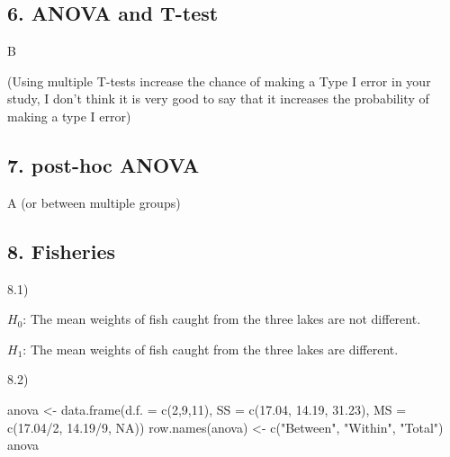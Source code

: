 \documentclass[
]{article}
\newenvironment{Shaded}{\begin{snugshade}}{\end{snugshade}}
\newcommand{\AttributeTok}[1]{\textcolor[rgb]{0.77,0.63,0.00}{#1}}
\newcommand{\ConstantTok}[1]{\textcolor[rgb]{0.00,0.00,0.00}{#1}}
\newcommand{\DecValTok}[1]{\textcolor[rgb]{0.00,0.00,0.81}{#1}}
\newcommand{\FloatTok}[1]{\textcolor[rgb]{0.00,0.00,0.81}{#1}}
\newcommand{\FunctionTok}[1]{\textcolor[rgb]{0.00,0.00,0.00}{#1}}
\newcommand{\NormalTok}[1]{#1}
\newcommand{\OtherTok}[1]{\textcolor[rgb]{0.56,0.35,0.01}{#1}}
\newcommand{\SpecialCharTok}[1]{\textcolor[rgb]{0.00,0.00,0.00}{#1}}
\newcommand{\StringTok}[1]{\textcolor[rgb]{0.31,0.60,0.02}{#1}}
\begin{document}
\hypertarget{anova-and-t-test}{%
\subsection{6. ANOVA and T-test}\label{anova-and-t-test}}

B

(Using multiple T-tests increase the chance of making a Type I error in
your study, I don't think it is very good to say that it increases the
probability of making a type I error)

\hypertarget{post-hoc-anova}{%
\subsection{\texorpdfstring{7. \textbf{post-hoc}
ANOVA}{7. post-hoc ANOVA}}\label{post-hoc-anova}}

A (or between multiple groups)

\hypertarget{fisheries}{%
\subsection{8. Fisheries}\label{fisheries}}

8.1)

\(H_0\): The mean weights of fish caught from the three lakes are not
different.

\(H_1\): The mean weights of fish caught from the three lakes are
different.

8.2)

\begin{Shaded}
\begin{Highlighting}[]
\NormalTok{anova }\OtherTok{\textless{}{-}} \FunctionTok{data.frame}\NormalTok{(}\AttributeTok{d.f. =} \FunctionTok{c}\NormalTok{(}\DecValTok{2}\NormalTok{,}\DecValTok{9}\NormalTok{,}\DecValTok{11}\NormalTok{),}
                    \AttributeTok{SS =} \FunctionTok{c}\NormalTok{(}\FloatTok{17.04}\NormalTok{, }\FloatTok{14.19}\NormalTok{, }\FloatTok{31.23}\NormalTok{),}
                    \AttributeTok{MS =} \FunctionTok{c}\NormalTok{(}\FloatTok{17.04}\SpecialCharTok{/}\DecValTok{2}\NormalTok{, }\FloatTok{14.19}\SpecialCharTok{/}\DecValTok{9}\NormalTok{, }\ConstantTok{NA}\NormalTok{))}
\FunctionTok{row.names}\NormalTok{(anova) }\OtherTok{\textless{}{-}} \FunctionTok{c}\NormalTok{(}\StringTok{"Between"}\NormalTok{, }\StringTok{"Within"}\NormalTok{, }\StringTok{"Total"}\NormalTok{)}
\NormalTok{anova}
\end{Highlighting}
\end{Shaded}
\end{document}
